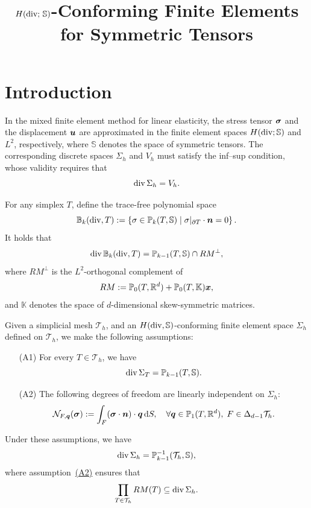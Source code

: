 \documentclass[letterpaper,12pt]{article}
\title{$H(\mathop{\mathrm{div}};\,\mathbb{S})$-Conforming Finite Elements for Symmetric Tensors}
\begin{document}
\maketitle

\tableofcontents

\section{Introduction}\label{sec:intro}

In the mixed finite element method for linear elasticity, the stress tensor $\boldsymbol{\sigma}$ and the displacement $\boldsymbol{u}$ are approximated in the finite element spaces 
$H(\mathop{\mathrm{div}}; \mathbb{S})$ and $L^2$, respectively, where $\mathbb{S}$ denotes the space of symmetric tensors. The corresponding discrete spaces $\Sigma_h$ and $V_h$ must satisfy the inf–sup condition, whose validity requires that 
$$
\mathop{\mathrm{div}} \Sigma_h = V_h.
$$

For any simplex $T$, define the trace-free polynomial space
$$
\mathbb{B}_k(\mathop{\mathrm{div}}, T) := \left\{ \sigma \in \mathbb{P}_k(T, \mathbb{S}) \;\middle|\; \sigma|_{\partial T} \cdot \boldsymbol{n} = 0 \right\}.
$$
It holds that
$$
\mathop{\mathrm{div}} \mathbb{B}_k(\mathop{\mathrm{div}}, T) = \mathbb{P}_{k-1}(T, \mathbb{S}) \cap RM^{\perp},
$$
where $RM^{\perp}$ is the $L^2$-orthogonal complement of 
$$
RM := \mathbb{P}_0(T, \mathbb{R}^d) + \mathbb{P}_0(T, \mathbb{K})\boldsymbol{x},
$$ 
and $\mathbb{K}$ denotes the space of $d$-dimensional skew-symmetric matrices.

Given a simplicial mesh $\mathcal{T}_h$, and an $H(\mathop{\mathrm{div}}, \mathbb{S})$-conforming finite element space $\Sigma_h$ defined on $\mathcal{T}_h$, we make the following assumptions:
\begin{enumerate}
    \item[(A1)]\label{assumption1prim} For every $T \in \mathcal{T}_h$, we have
    $$
    \mathop{\mathrm{div}} \Sigma_T = \mathbb{P}_{k-1}(T, \mathbb{S}).
    $$
    
    \item[(A2)]\label{assumption2} The following degrees of freedom are linearly independent on $\Sigma_h$: 
    $$
    \mathcal{N}_{F, \boldsymbol{q}}(\boldsymbol{\sigma}) := \int_{F} (\boldsymbol{\sigma} \cdot \boldsymbol{n}) \cdot \boldsymbol{q} \, \mathrm{d}S, \quad \forall \boldsymbol{q} \in \mathbb{P}_1 (T, \mathbb{R}^d), \; F \in \Delta_{d-1}\mathcal{T}_h.
    $$
\end{enumerate}

Under these assumptions, we have
$$
\mathop{\mathrm{div}} \Sigma_h = \mathbb{P}_{k-1}^{-1}(\mathcal{T}_h, \mathbb{S}),
$$
where assumption~\hyperref[assumption2]{(A2)} ensures that
$$
\prod_{T \in \mathcal{T}_h} RM(T) \subseteq \mathop{\mathrm{div}} \Sigma_h.
$$
\end{document}
